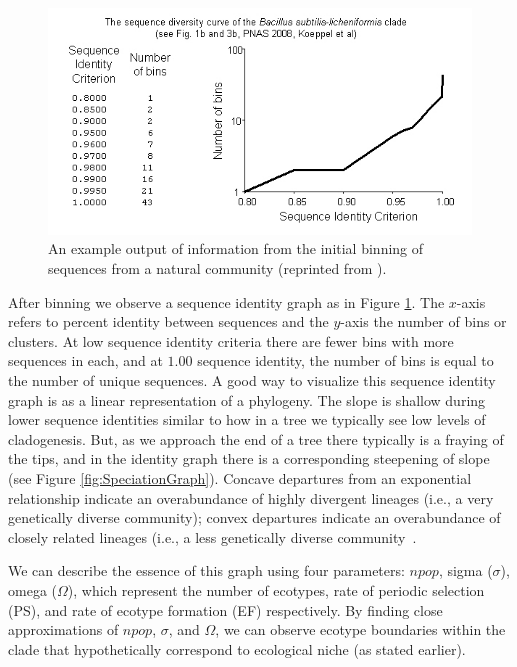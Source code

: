 \begin{figure}[h!]
 \centering
 \label{fig:Binning}
 \includegraphics[scale=1.75]{images/Binning-CH2}
 \caption[Sequence identity graph and example output produced by binning.]{An example output of information from the initial binning of sequences from a natural community (reprinted from \protect\cite{koeppel2008identifying}). }
  \label{fig:Binning}
\end{figure}

After binning we observe a sequence identity graph as in Figure \ref{fig:Binning}.
The $x$-axis refers to percent identity between sequences and the $y$-axis the number of bins or clusters.
At low sequence identity criteria there are fewer bins with more sequences in each, and at $1.00$ sequence identity, the number of bins is equal to the number of unique sequences.
A good way to visualize this sequence identity graph is as a linear representation of a phylogeny.
The slope is shallow during lower sequence identities similar to how in a tree we typically see low levels of cladogenesis.
But, as we approach the end of a tree there typically is a fraying of the tips, and in the identity graph there is a corresponding steepening of slope (see Figure \ref{fig:SpeciationGraph}).
Concave departures from an exponential relationship indicate an overabundance of highly divergent lineages (i.e., a very genetically diverse community); convex departures indicate an overabundance of closely related lineages (i.e., a less genetically diverse community~\cite{bohannan2003new}.

We can describe the essence of this graph using four parameters: $npop$, sigma ($\sigma$), omega ($\Omega$), which represent the number of ecotypes, rate of periodic selection (PS), and rate of ecotype formation (EF) respectively.
By finding close approximations of $npop$, $\sigma$, and $\Omega$, we can observe ecotype boundaries within the clade that hypothetically correspond to ecological niche (as stated earlier).

